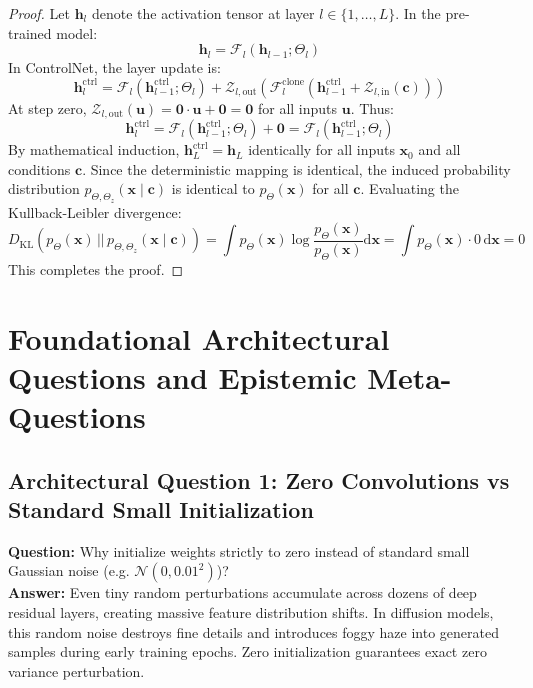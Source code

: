 \documentclass[11pt,a4paper]{article}
\theoremstyle{definition}
\begin{document}
\begin{proof}
Let $\mathbf{h}_l$ denote the activation tensor at layer $l \in \{1, \dots, L\}$.
In the pre-trained model:
{\boldmath
\begin{equation}
\mathbf{h}_l = \mathcal{F}_l(\mathbf{h}_{l-1}; \Theta_l)
\end{equation}
}
In ControlNet, the layer update is:
{\boldmath
\begin{equation}
\mathbf{h}_l^{\text{ctrl}} = \mathcal{F}_l(\mathbf{h}_{l-1}^{\text{ctrl}}; \Theta_l) + \mathcal{Z}_{l, \text{out}}\left( \mathcal{F}_l^{\text{clone}}(\mathbf{h}_{l-1}^{\text{ctrl}} + \mathcal{Z}_{l, \text{in}}(\mathbf{c})) \right)
\end{equation}
}
At step zero, $\mathcal{Z}_{l, \text{out}}(\mathbf{u}) = \mathbf{0} \cdot \mathbf{u} + \mathbf{0} = \mathbf{0}$ for all inputs $\mathbf{u}$.
Thus:
{\boldmath
\begin{equation}
\mathbf{h}_l^{\text{ctrl}} = \mathcal{F}_l(\mathbf{h}_{l-1}^{\text{ctrl}}; \Theta_l) + \mathbf{0} = \mathcal{F}_l(\mathbf{h}_{l-1}^{\text{ctrl}}; \Theta_l)
\end{equation}
}
By mathematical induction, $\mathbf{h}_L^{\text{ctrl}} = \mathbf{h}_L$ identically for all inputs $\mathbf{x}_0$ and all conditions $\mathbf{c}$.
Since the deterministic mapping is identical, the induced probability distribution $p_{\Theta, \Theta_z}(\mathbf{x} \mid \mathbf{c})$ is identical to $p_{\Theta}(\mathbf{x})$ for all $\mathbf{c}$.
Evaluating the Kullback-Leibler divergence:
{\boldmath
\begin{equation}
D_{\text{KL}}\left( p_{\Theta}(\mathbf{x}) \,||\, p_{\Theta, \Theta_z}(\mathbf{x} \mid \mathbf{c}) \right) = \int p_{\Theta}(\mathbf{x}) \log \frac{p_{\Theta}(\mathbf{x})}{p_{\Theta}(\mathbf{x})} \mathrm{d}\mathbf{x} = \int p_{\Theta}(\mathbf{x}) \cdot 0 \, \mathrm{d}\mathbf{x} = 0
\end{equation}
}
This completes the proof.
\end{proof}

\section{Foundational Architectural Questions and Epistemic Meta-Questions}

\subsection{Architectural Question 1: Zero Convolutions vs Standard Small Initialization}
\textbf{Question:} Why initialize weights strictly to zero instead of standard small Gaussian noise (e.g. $\mathcal{N}(0, 0.01^2)$)?\\
\textbf{Answer:} Even tiny random perturbations accumulate across dozens of deep residual layers, creating massive feature distribution shifts. In diffusion models, this random noise destroys fine details and introduces foggy haze into generated samples during early training epochs. Zero initialization guarantees exact zero variance perturbation.
\end{document}
